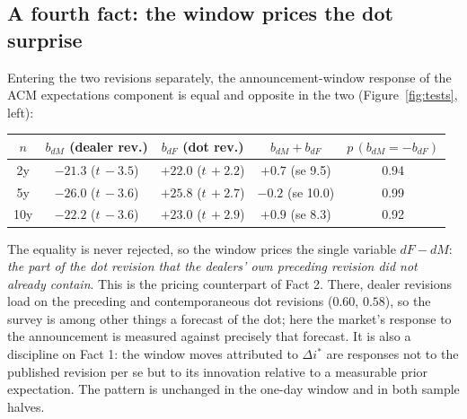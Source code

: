 \documentclass[11pt]{article}
\begin{document}
\subsection{A fourth fact: the window prices the dot surprise}
\label{sec:test-fact4}
Entering the two revisions separately, the announcement-window response of the ACM expectations
component is equal and opposite in the two (Figure~\ref{fig:tests}, left):
\begin{center}\small
\begin{tabular}{ccccc}
\toprule
$n$ & $b_{dM}$ (dealer rev.) & $b_{dF}$ (dot rev.) & $b_{dM}+b_{dF}$ & $p\,(b_{dM}=-b_{dF})$\\
\midrule
2y & $-21.3$ ($t\,{-}3.5$) & $+22.0$ ($t\,{+}2.2$) & $+0.7$ (se 9.5) & 0.94\\
5y & $-26.0$ ($t\,{-}3.6$) & $+25.8$ ($t\,{+}2.7$) & $-0.2$ (se 10.0) & 0.99\\
10y & $-22.2$ ($t\,{-}3.6$) & $+23.0$ ($t\,{+}2.9$) & $+0.9$ (se 8.3) & 0.92\\
\bottomrule
\end{tabular}
\end{center}
\noindent The equality is never rejected, so the window prices the single variable $dF-dM$:
\emph{the part of the dot revision that the dealers' own preceding revision did not already
contain}. This is the pricing counterpart of Fact 2. There, dealer revisions load on the
preceding and contemporaneous dot revisions ($0.60$, $0.58$), so the survey is among other
things a forecast of the dot; here the market's response to the announcement is measured against
precisely that forecast. It is also a discipline on Fact 1: the window moves attributed to
$\Delta i^{*}$ are responses not to the published revision per se but to its innovation relative
to a measurable prior expectation. The pattern is unchanged in the one-day window and in both
sample halves.
\end{document}
